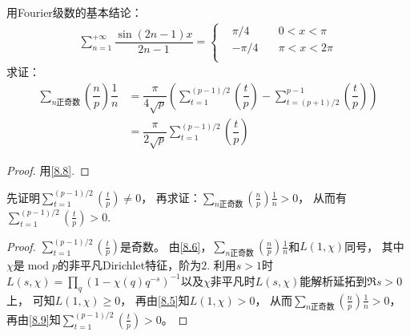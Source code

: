 \begin{exercise}\label{8.9}
    用Fourier级数的基本结论：
    \begin{align*}
        \sum_{n=1}^{+\infty}\dfrac{\sin(2n-1)x}{2n-1}=
        \left\{ 
        \begin{aligned}
            &\pi/4\quad&0<x<\pi\\
            &-\pi/4\quad&\pi<x<2\pi\\
        \end{aligned}
         \right.
    \end{align*}
    求证：
    \begin{align*}
        \sum_{n正奇数}\left(\dfrac{n}{p}\right)\dfrac{1}{n}&=
        \dfrac{\pi}{4\sqrt{p}}
        \left( 
        \sum_{t=1}^{(p-1)/2}\left(\dfrac{t}{p}\right)-
        \sum_{t=(p+1)/2}^{p-1}\left(\dfrac{t}{p}\right)
         \right)\\
         &=
         \dfrac{\pi}{2\sqrt{p}}\sum_{t=1}^{(p-1)/2}\left(\dfrac{t}{p}\right)
    \end{align*}
\end{exercise}
\begin{proof}
    用\ref{8.8}.
\end{proof}

\begin{exercise}
    先证明$\sum_{t=1}^{(p-1)/2}\left(\frac{t}{p}\right)\neq0$，
    再求证：$\sum_{n正奇数}\left(\frac{n}{p}\right)\frac{1}{n}>0$，
    从而有$\sum_{t=1}^{(p-1)/2}\left(\frac{t}{p}\right)>0$.
\end{exercise}
\begin{proof}
    $\sum_{t=1}^{(p-1)/2}\left(\frac{t}{p}\right)$是奇数。
    由\ref{8.6}，$\sum_{n正奇数}\left(\frac{n}{p}\right)\frac{1}{n}$和$L(1,\chi)$同号，
    其中$\chi$是$\operatorname{mod}p$的非平凡Dirichlet特征，阶为$2$.
    利用$s>1$时$L(s,\chi)=\prod_{q}(1-\chi(q)q^{-s})^{-1}$以及$\chi$非平凡时$L(s,\chi)$能解析延拓到$\Re s>0$上，
    可知$L(1,\chi)\geqslant0$，
    再由\ref{8.5}知$L(1,\chi)>0$，
    从而$\sum_{n正奇数}\left(\frac{n}{p}\right)\frac{1}{n}>0$，
    再由\ref{8.9}知$\sum_{t=1}^{(p-1)/2}\left(\frac{t}{p}\right)>0$。
\end{proof}